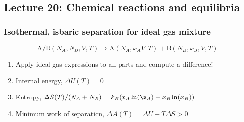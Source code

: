 \documentclass[11pt]{article}
\begin{document}
\subsection{Lecture 20: Chemical reactions and equilibria}
\label{sec:org569530d}
\subsubsection{Isothermal, isbaric separation for ideal gas mixture}
\label{sec:orgd39e184}
\[ \text{A/B} (N_{A},N_{B},V,T) \rightarrow \text{A}(N_{A},x_{A}V,T) + \text{B}(N_{B},x_{B},V,T) \]
\begin{enumerate}
\item Apply ideal gas expressions to all parts and compute a difference!
\item Internal energy, \(\Delta U(T) = 0\)
\item Entropy, \(\Delta S(T)/(N_A+N_B) = k_B(x_A\ln(\x_A) + x_B \ln(x_B))\)
\item Minimum work of separation, \(\Delta A(T) = \Delta U - T\Delta S > 0\)
\end{enumerate}
\end{document}
